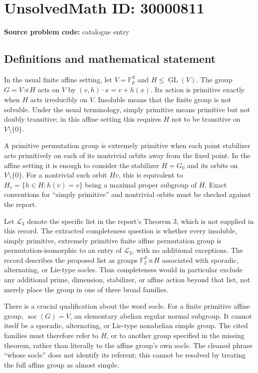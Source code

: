 \documentclass[11pt]{article}
\newcommand{\F}{\mathbb{F}}
\begin{document}
\section*{UnsolvedMath ID: 30000811}
\textbf{Source problem code:} catalogue entry
\subsection{Definitions and mathematical statement}
In the usual finite affine setting, let \(V=\F_p^d\) and \(H\leq\operatorname{GL}(V)\). The group \(G=V\rtimes H\) acts on \(V\) by \((v,h)\cdot x=v+h(x)\). Its action is primitive exactly when \(H\) acts irreducibly on \(V\). Insoluble means that the finite group is not solvable. Under the usual terminology, simply primitive means primitive but not doubly transitive; in this affine setting this requires \(H\) not to be transitive on \(V\setminus\{0\}\).

A primitive permutation group is extremely primitive when each point stabilizer acts primitively on each of its nontrivial orbits away from the fixed point. In the affine setting it is enough to consider the stabilizer \(H=G_0\) and its orbits on \(V\setminus\{0\}\). For a nontrivial such orbit \(Hv\), this is equivalent to \(H_v=\{h\in H:h(v)=v\}\) being a maximal proper subgroup of \(H\). Exact conventions for ``simply primitive'' and nontrivial orbits must be checked against the report.

Let \(\mathcal L_3\) denote the specific list in the report's Theorem 3, which is not supplied in this record. The extracted completeness question is whether every insoluble, simply primitive, extremely primitive finite affine permutation group is permutation-isomorphic to an entry of \(\mathcal L_3\), with no additional exceptions. The record describes the proposed list as groups \(\F_2^d\rtimes H\) associated with sporadic, alternating, or Lie-type socles. Thus completeness would in particular exclude any additional prime, dimension, stabilizer, or affine action beyond that list, not merely place the group in one of three broad families.

There is a crucial qualification about the word socle. For a finite primitive affine group, \(\operatorname{soc}(G)=V\), an elementary abelian regular normal subgroup. It cannot itself be a sporadic, alternating, or Lie-type nonabelian simple group. The cited families must therefore refer to \(H\), or to another group specified in the missing theorem, rather than literally to the affine group's own socle. The cleaned phrase ``whose socle'' does not identify its referent; this cannot be resolved by treating the full affine group as almost simple.
\end{document}
